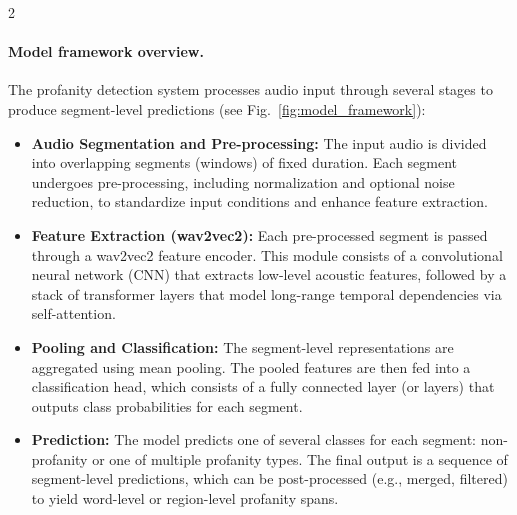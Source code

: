\documentclass[11pt,a4paper]{article}
\newenvironment{Figure}
  {\par\medskip\noindent\minipage{\linewidth}}
  {\endminipage\par\medskip}
\begin{document}
\begin{multicols}{2}
\paragraph{Model framework overview.} The profanity detection system processes audio input through several stages to produce segment-level predictions (see Fig.~\ref{fig:model_framework}):
\begin{itemize}
  \item \textbf{Audio Segmentation and Pre-processing:} The input audio is divided into overlapping segments (windows) of fixed duration. Each segment undergoes pre-processing, including normalization and optional noise reduction, to standardize input conditions and enhance feature extraction.
  \item \textbf{Feature Extraction (wav2vec2):} Each pre-processed segment is passed through a wav2vec2 feature encoder. This module consists of a convolutional neural network (CNN) that extracts low-level acoustic features, followed by a stack of transformer layers that model long-range temporal dependencies via self-attention.
  \item \textbf{Pooling and Classification:} The segment-level representations are aggregated using mean pooling. The pooled features are then fed into a classification head, which consists of a fully connected layer (or layers) that outputs class probabilities for each segment.
  \item \textbf{Prediction:} The model predicts one of several classes for each segment: non-profanity or one of multiple profanity types. The final output is a sequence of segment-level predictions, which can be post-processed (e.g., merged, filtered) to yield word-level or region-level profanity spans.
\end{itemize}

\begin{Figure}
\centering
{}
\end{Figure}
\end{multicols}
\end{document}
